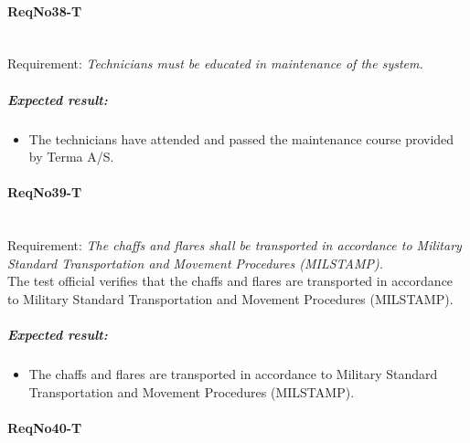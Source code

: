 \paragraph{ReqNo38-T}\mbox{}\\ %
Requirement: \textit{Technicians must be educated in maintenance of the system.}\\

\subparagraph{Expected result:}
	\begin{itemize}
	\item The technicians have attended and passed the maintenance course provided by Terma A/S.
	\end{itemize}

\paragraph{ReqNo39-T}\mbox{}\\ %
Requirement: \textit{The chaffs and flares shall be transported in accordance to Military Standard Transportation and Movement Procedures (MILSTAMP).}\\

The test official verifies that the chaffs and flares are transported in accordance to Military Standard Transportation and Movement Procedures (MILSTAMP).

\subparagraph{Expected result:}
	\begin{itemize}
	\item The chaffs and flares are transported in accordance to Military Standard Transportation and Movement Procedures (MILSTAMP).
	\end{itemize}

\paragraph{ReqNo40-T}\mbox{}\\ %